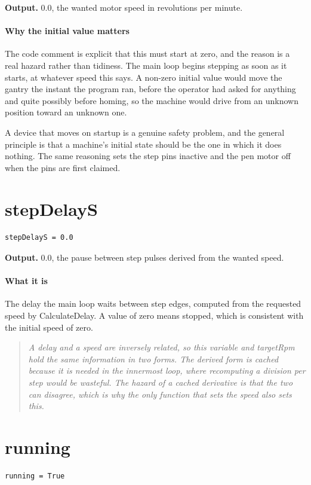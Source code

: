\noindent\textbf{Output.} 0.0, the wanted motor speed in revolutions per minute.


\paragraph{Why the initial value matters}
The code comment is explicit that this must start at zero, and the reason is a real hazard rather than tidiness. The main loop begins stepping as soon as it starts, at whatever speed this says. A non-zero initial value would move the gantry the instant the program ran, before the operator had asked for anything and quite possibly before homing, so the machine would drive from an unknown position toward an unknown one.

A device that moves on startup is a genuine safety problem, and the general principle is that a machine's initial state should be the one in which it does nothing. The same reasoning sets the step pins inactive and the pen motor off when the pins are first claimed.


\section{stepDelayS}
\begin{lstlisting}[style=sig]
stepDelayS = 0.0
\end{lstlisting}

\noindent\textbf{Output.} 0.0, the pause between step pulses derived from the wanted speed.


\paragraph{What it is}
The delay the main loop waits between step edges, computed from the requested speed by CalculateDelay. A value of zero means stopped, which is consistent with the initial speed of zero.


\begin{quote}\small\itshape A delay and a speed are inversely related, so this variable and targetRpm hold the same information in two forms. The derived form is cached because it is needed in the innermost loop, where recomputing a division per step would be wasteful. The hazard of a cached derivative is that the two can disagree, which is why the only function that sets the speed also sets this.\end{quote}

\section{running}
\begin{lstlisting}[style=sig]
running = True
\end{lstlisting}


